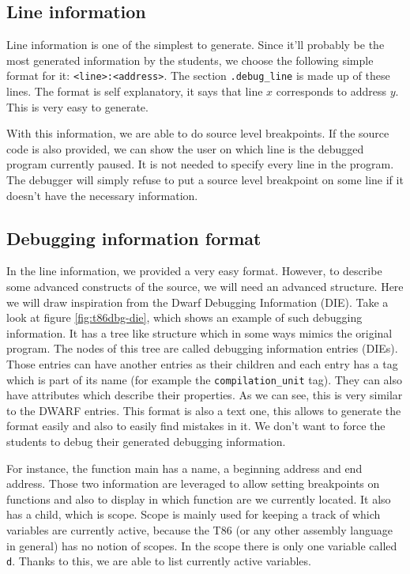 \subsection{Line information}
Line information is one of the simplest to generate. Since it'll probably be
the most generated information by the students, we choose the following simple
format for it: \texttt{<line>:<address>}. The section \texttt{.debug\_line} is
made up of these lines. The format is self explanatory, it says that line $x$
corresponds to address $y$. This is very easy to generate.

With this information, we are able to do source level breakpoints. If the
source code is also provided, we can show the user on which line is the
debugged program currently paused. It is not needed to specify every line in
the program. The debugger will simply refuse to put a source level breakpoint
on some line if it doesn't have the necessary information.

\subsection{Debugging information format}
In the line information, we provided a very easy format. However, to describe
some advanced constructs of the source, we will need an advanced structure.
Here we will draw inspiration from the Dwarf Debugging Information (DIE). Take
a look at figure \ref{fig:t86dbg-die}, which shows an example of such debugging
information. It has a tree like structure which in some ways mimics the
original program. The nodes of this tree are called debugging information
entries (DIEs). Those entries can have another entries as their children and
each entry has a tag which is part of its name (for example the
\texttt{compilation\_unit} tag). They can also have attributes which describe
their properties. As we can see, this is very similar to the DWARF entries.
This format is also a text one, this allows to generate the format easily and
also to easily find mistakes in it. We don't want to force the students to
debug their generated debugging information.

For instance, the function main has a name, a beginning address and end
address. Those two information are leveraged to allow setting breakpoints on
functions and also to display in which function are we currently located.
It also has a child, which is scope. Scope is mainly used for keeping
a track of which variables are currently active, because the T86 (or
any other assembly language in general) has no notion of scopes.
In the scope there is only one variable called \texttt{d}. Thanks to this,
we are able to list currently active variables.

